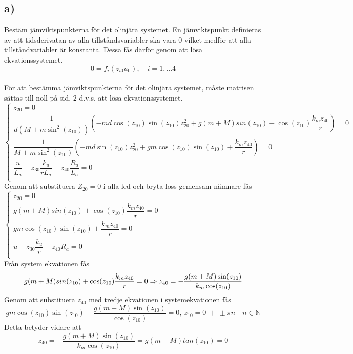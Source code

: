 \documentclass[11pt]{article}
\begin{document}
\subsection{a)}
Bestäm jämviktspunkterna för det olinjära systemet. En jämviktspunkt definieras av
att tidsderivatan av alla tillståndsvariabler ska vara 0 vilket medför att alla tillståndvariabler
är konstanta. Dessa fås därför genom att lösa ekvationssystemet.
$$
0=f_i(z_{i0}u_0), \quad i=1,...4
$$ \\[0.5em]
För att bestämma jämviktspunkterna för det olinjära systemet, måste matrisen sättas till noll på sid. 2 d.v.s. att lösa ekvationssystemet. 
\\[1em]
$
\begin{cases}
z_{20} =0\\
\dfrac{1}{d(M+m\sin^2(z_{10}))}(-md\cos(z_{10})\sin(z_{10})z_{20}^2+g(m+M)sin(z_{10})+\cos(z_{10})\dfrac{k_mz_{40}}{r}) =0\\
\dfrac{1}{M+m\sin^2(z_{10})}(-md\sin(z_{10})z_{20}^2+gm\cos(z_{10})\sin(z_{10})+\dfrac{k_mz_{40}}{r}) =0\\
\dfrac{u}{L_a}-z_{30}\dfrac{k_u}{rL_a}-z_{40}\dfrac{R_a}{L_a} =0\\
\end{cases}
$ \\[1em]
Genom att substituera $Z_{20}=0$ i alla led och bryta loss gemensam nämnare fås \\ [1em]
$
\begin{cases}
z_{20} =0\\
g(m+M)sin(z_{10})+\cos(z_{10})\dfrac{k_mz_{40}}{r} =0\\
gm\cos(z_{10})\sin(z_{10})+\dfrac{k_mz_{40}}{r} =0\\
u-z_{30}\dfrac{k_u}{r}-z_{40}R_a =0\\
\end{cases}
$\\[1em]
Från system ekvationen fås 
\begin{equation*}
g(m+M)sin(z_{10})+\cos(z_{10})\dfrac{k_mz_{40}}{r} =0\\ \Rightarrow z_{40} = -\dfrac{g(m+M)\sin(z_{10})}{k_m\cos(z_{10})}
\end{equation*}
Genom att substituera $z_{40}$ med tredje ekvationen i systemekvationen fås
\begin{equation*}
gm\cos(z_{10})\sin(z_{10})-\dfrac{g(m+M)\sin(z_{10})}{\cos(z_{10})} =0, \ z_{10} =0 \ + \ \pm \pi n \quad n \in \mathbb{N}
\end{equation*} Detta betyder vidare att \begin{equation*}
 z_{40} = -\dfrac{g(m+M)\sin(z_{10})}{k_m\cos(z_{10})} =g(m+M)tan(z_{10}) =0
\end{equation*}
\end{document}
